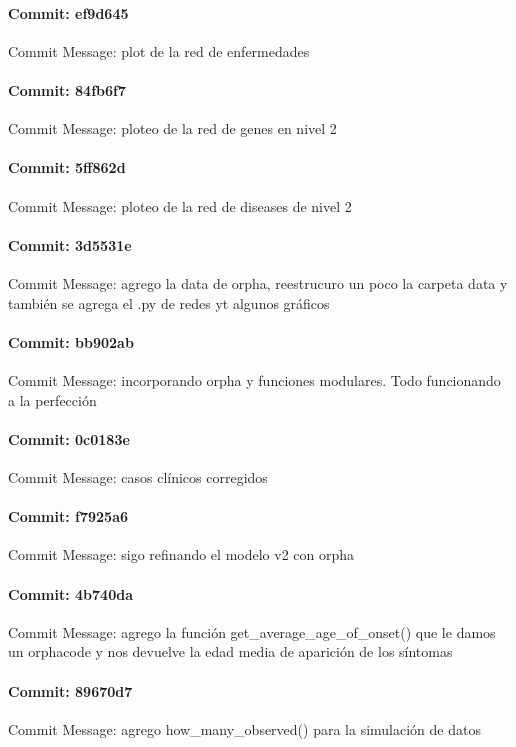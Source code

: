 \documentclass{article}
\begin{document}
\paragraph{Commit: ef9d645}
Commit Message: plot de la red de enfermedades

\paragraph{Commit: 84fb6f7}
Commit Message: ploteo de la red de genes en nivel 2

\paragraph{Commit: 5ff862d}
Commit Message: ploteo de la red de diseases de nivel 2

\paragraph{Commit: 3d5531e}
Commit Message: agrego la data de orpha, reestrucuro un poco la carpeta data y también se agrega el .py de redes yt algunos gráficos

\paragraph{Commit: bb902ab}
Commit Message: incorporando orpha y funciones modulares. Todo funcionando a la perfección

\paragraph{Commit: 0c0183e}
Commit Message: casos clínicos corregidos

\paragraph{Commit: f7925a6}
Commit Message: sigo refinando el modelo v2 con orpha

\paragraph{Commit: 4b740da}
Commit Message: agrego la función get_average_age_of_onset() que le damos un orphacode y nos devuelve la edad media de aparición de los síntomas

\paragraph{Commit: 89670d7}
Commit Message: agrego how_many_observed() para la simulación de datos
\end{document}
